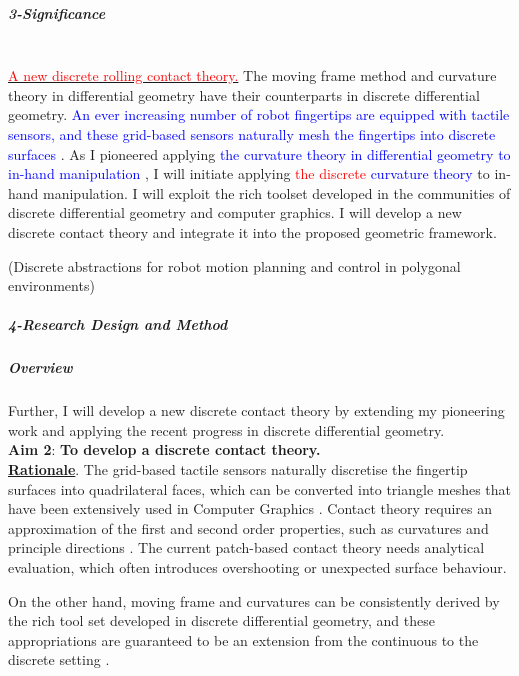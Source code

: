 \subparagraph*{3-Significance} \mbox{}\\

\uline{\textcolor{red}{A new discrete rolling contact theory.}} The moving frame method and curvature theory in differential geometry have their counterparts in discrete differential geometry. \textcolor{blue}{An ever increasing number of robot fingertips are equipped with tactile sensors, and these grid-based sensors naturally mesh the fingertips into discrete surfaces} \cite{Lei14_Teleoperation_ThumbRobotHand,  Bagnell12_IntegratedSystem_AutonomousRoboticsManipulation}.
As I pioneered applying \textcolor{blue}{the curvature theory in differential geometry to in-hand manipulation} \cite{Lei09_coordinate-free_instantaneous_kinematics, Lei10_Darboux-Frame, Lei10_Geometric.Kinematics_PointContact, Lei15_PolynomialFormulation_InverseKinematics, Lei15_sliding.rolling.loci_kinematics, Lei09_Kinematic.Geometry_Circular.Surfaces}, I will initiate applying \textcolor{red}{the discrete} \textcolor{blue}{curvature theory} to in-hand manipulation. I will exploit the rich toolset developed in the communities of discrete differential geometry and computer graphics. I will develop a new discrete contact theory
and integrate it into the proposed geometric framework.

\newpage

\cite{Belta_2005_Discrete_MP} (Discrete abstractions for robot motion planning and control in polygonal environments)
\subparagraph{4-Research Design and Method}
\subparagraph*{Overview} Further, I will develop a new discrete contact theory by extending my pioneering work and applying the recent progress in discrete differential geometry.\\

\textbf{Aim 2}: \textbf{To develop a discrete contact theory.}\\

\uline{\textbf{Rationale}}. The grid-based tactile sensors naturally discretise the fingertip surfaces into quadrilateral faces, which can be converted into triangle meshes that have been extensively used in Computer Graphics \cite{Martin04_Quadrilateral_Discrete}. Contact theory requires an approximation of the first and second order properties, such as curvatures and principle directions \cite{Lei10_Darboux-Frame, Montana88_Kinematics_Contact_Grasp}. The current patch-based contact theory needs analytical evaluation, which often introduces overshooting or unexpected surface behaviour. 

On the other hand, moving frame and curvatures can be consistently derived by the rich tool set developed in discrete differential geometry, and these appropriations are guaranteed to be an extension from the continuous to the discrete setting \cite{Meyer03_Discrete_Diff.Geo_2Manifolds}.\\

